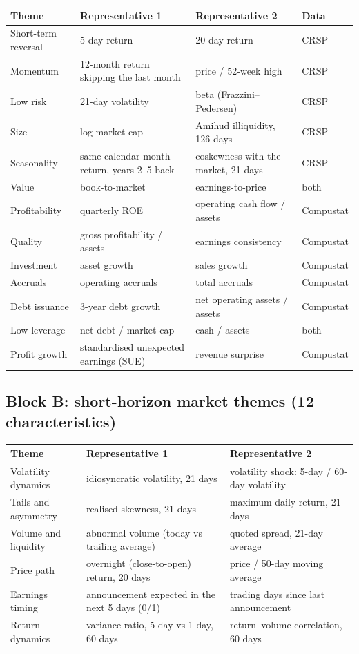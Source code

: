 {\small
\begin{tabularx}{\textwidth}{@{}l X X l@{}}
\toprule
Theme & Representative 1 & Representative 2 & Data\\
\midrule
Short-term reversal & 5-day return & 20-day return & CRSP\\
Momentum & 12-month return skipping the last month & price / 52-week high & CRSP\\
Low risk & 21-day volatility & beta (Frazzini--Pedersen) & CRSP\\
Size & log market cap & Amihud illiquidity, 126 days & CRSP\\
Seasonality & same-calendar-month return, years 2--5 back & coskewness with the market, 21 days & CRSP\\
Value & book-to-market & earnings-to-price & both\\
Profitability & quarterly ROE & operating cash flow / assets & Compustat\\
Quality & gross profitability / assets & earnings consistency & Compustat\\
Investment & asset growth & sales growth & Compustat\\
Accruals & operating accruals & total accruals & Compustat\\
Debt issuance & 3-year debt growth & net operating assets / assets & Compustat\\
Low leverage & net debt / market cap & cash / assets & both\\
Profit growth & standardised unexpected earnings (SUE) & revenue surprise & Compustat\\
\bottomrule
\end{tabularx}}

\subsection{Block B: short-horizon market themes (12 characteristics)}

{\small
\begin{tabularx}{\textwidth}{@{}l X X@{}}
\toprule
Theme & Representative 1 & Representative 2\\
\midrule
Volatility dynamics & idiosyncratic volatility, 21 days & volatility shock: 5-day / 60-day volatility\\
Tails and asymmetry & realised skewness, 21 days & maximum daily return, 21 days\\
Volume and liquidity & abnormal volume (today vs trailing average) & quoted spread, 21-day average\\
Price path & overnight (close-to-open) return, 20 days & price / 50-day moving average\\
Earnings timing & announcement expected in the next 5 days (0/1) & trading days since last announcement\\
Return dynamics & variance ratio, 5-day vs 1-day, 60 days & return--volume correlation, 60 days\\
\bottomrule
\end{tabularx}}

